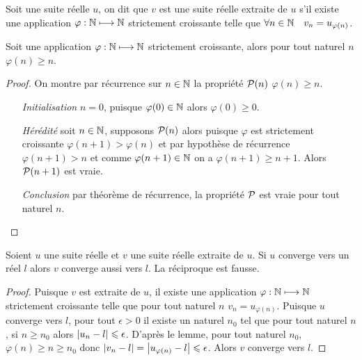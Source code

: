 \begin{defdef}
    Soit une suite réelle \(u\), on dit que \(v\) est une suite réelle extraite de 
    \(u\) s'il existe une application \(\varphi:\N \longmapsto \N\) strictement 
    croissante telle que \(\forall n\in \N \quad v_n = u_{\varphi(n)}\).
\end{defdef}
\begin{lemme}
    Soit une application \(\varphi:\N \longmapsto \N\) strictement croissante, 
    alors pour tout naturel \(n\) \(\varphi(n) \geqslant n\).
\end{lemme}
\begin{proof}
    On montre par récurrence sur \(n \in \N\) la propriété \(\P(n)\) \(\varphi(n) 
    \geqslant n\).
    \begin{itemize}
        \item[\emph{Initialisation}] \(n = 0\), puisque \(\varphi(0) \in \N\) alors 
            \(\varphi(0) \geqslant 0\).
        \item[\emph{Hérédité}] soit \(n \in \N\), supposons \(\P(n)\) alors puisque 
            \(\varphi\) est strictement croissante \(\varphi(n+1) > \varphi(n)\) et 
            par hypothèse de récurrence \(\varphi(n+1) > n\) et comme \(\varphi(n+1) 
            \in \N\) on a \(\varphi(n+1) \geqslant n+1\). Alors \(\P(n+1)\) est vraie.
        \item[\emph{Conclusion}] par théorème de récurrence, la propriété \(\P\) est 
            vraie pour tout naturel \(n\).
    \end{itemize}
\end{proof}
\begin{prop}
    Soient \(u\) une suite réelle et \(v\) une suite réelle extraite de \(u\). Si 
    \(u\) converge vers un réel \(l\) alors \(v\) converge aussi vers \(l\). La 
    réciproque est fausse.
\end{prop}
\begin{proof}
    Puisque \(v\) est extraite de \(u\), il existe une application \(\varphi:\N 
    \longmapsto \N\) strictement croissante telle que pour tout naturel \(n\) 
    \(v_n = u_{\varphi(n)}\). Puisque \(u\) converge vers \(l\), pour tout 
    \(\epsilon>0\) il existe un naturel \(n_0\) tel que pour tout naturel \(n\), 
    si \(n \geqslant n_0\) alors \(\abs{u_n-l} \leqslant \epsilon\). D'après le 
    lemme, pour tout naturel \(n_0\), \(\varphi(n) \geqslant n \geqslant n_0\) 
    donc \(\abs{v_n-l} = \abs{u_{\varphi(n)}-l} \leqslant \epsilon\). Alors \(v\) 
    converge vers \(l\).
\end{proof}
